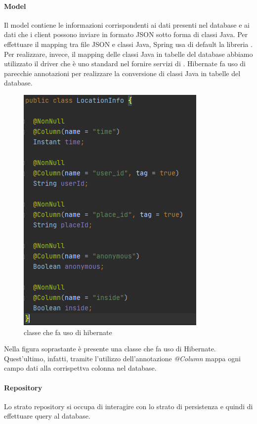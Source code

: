 \documentclass[../manuale-sviluppatore.tex]{subfiles}
\begin{document}
\paragraph{Model}%
\label{par:model}

Il model contiene le informazioni corrispondenti ai dati presenti nel database e ai dati che i client possono inviare in formato JSON sotto forma di classi Java.
Per effettuare il mapping tra file JSON e classi Java, Spring usa di default la libreria .
Per realizzare, invece, il mapping delle classi Java in tabelle del database abbiamo utilizzato il driver  che è uno standard nel fornire servizi di .
Hibernate fa uso di parecchie annotazioni per realizzare la conversione di classi Java in tabelle del database.

\begin{figure}[H]
  \centering
  \includegraphics{img/hibernate-example.png}
  \caption{classe che fa uso di hibernate}%
   \label{fig:classe che fa uso di hibernate}
\end{figure}

Nella figura soprastante è presente una classe che fa uso di Hibernate.
Quest'ultimo, infatti, tramite l'utilizzo dell'annotazione \textit{@Column} mappa ogni campo dati alla corrispettva colonna nel database.


\paragraph{Repository}%
\label{par:repository}

Lo strato repository si occupa di interagire con lo strato di persistenza e quindi di effettuare query al database.
\end{document}
